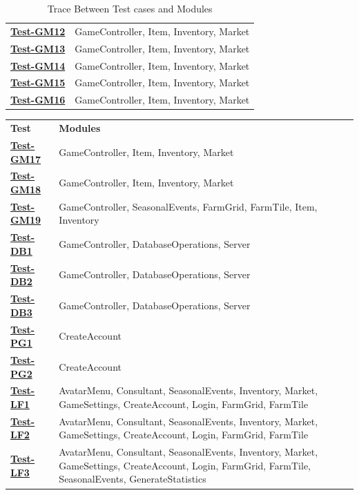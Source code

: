 \documentclass[12pt, titlepage]{article}
\begin{document}
\begin{table}[H]
\begin{tabular}{p{} p{}}
\hyperref[Test-GM12]{\textbf{Test-GM12}} & GameController, Item, Inventory, Market\\
\hyperref[Test-GM13]{\textbf{Test-GM13}} & GameController, Item, Inventory, Market\\
\hyperref[Test-GM14]{\textbf{Test-GM14}} & GameController, Item, Inventory, Market\\
\hyperref[Test-GM15]{\textbf{Test-GM15}} & GameController, Item, Inventory, Market\\
\hyperref[Test-GM16]{\textbf{Test-GM16}} & GameController, Item, Inventory, Market\\
\bottomrule
\end{tabular}
\caption{Trace Between Test cases and Modules}
\label{TblRT}
\end{table}

\begin{table}[H]
\centering
\begin{tabular}{p{} p{}}
\toprule
\textbf{Test} & \textbf{Modules}\\
\hyperref[Test-GM17]{\textbf{Test-GM17}} & GameController, Item, Inventory, Market\\
\hyperref[Test-GM18]{\textbf{Test-GM18}} & GameController, Item, Inventory, Market\\
\hyperref[Test-GM19]{\textbf{Test-GM19}} & GameController, SeasonalEvents, FarmGrid, FarmTile, Item, Inventory\\
\hyperref[Test-DB1]{\textbf{Test-DB1}} & GameController, DatabaseOperations, Server\\
\hyperref[Test-DB2]{\textbf{Test-DB2}} & GameController, DatabaseOperations, Server\\
\hyperref[Test-DB3]{\textbf{Test-DB3}} & GameController, DatabaseOperations, Server\\
\hyperref[Test-PG1]{\textbf{Test-PG1}} & CreateAccount\\
\hyperref[Test-PG2]{\textbf{Test-PG2}} & CreateAccount\\
\hyperref[Test-LF1]{\textbf{Test-LF1}} & AvatarMenu, Consultant, SeasonalEvents, Inventory, Market, GameSettings, CreateAccount, Login, FarmGrid, FarmTile\\
\hyperref[Test-LF2]{\textbf{Test-LF2}} & AvatarMenu, Consultant, SeasonalEvents, Inventory, Market, GameSettings, CreateAccount, Login, FarmGrid, FarmTile\\
\hyperref[Test-LF3]{\textbf{Test-LF3}} & AvatarMenu, Consultant, SeasonalEvents, Inventory, Market, GameSettings, CreateAccount, Login, FarmGrid, FarmTile, SeasonalEvents, GenerateStatistics\\

\end{tabular}
\end{table}
\end{document}
